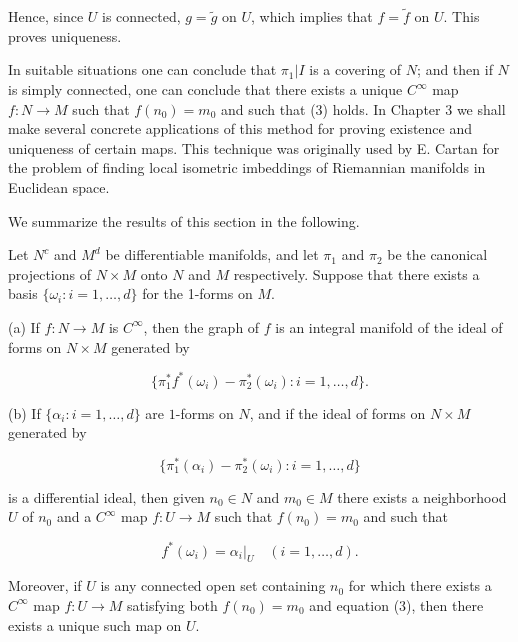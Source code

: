Hence, since $U$ is connected, $g = \tilde{g}$ on $U$, which implies that $f = \tilde{f}$ on $U$. This proves uniqueness.

In suitable situations one can conclude that  $ \pi_{1}|I $ is a covering of  $ N $; and then if  $ N $ is simply connected, one can conclude that there exists a unique  $ C^{\infty} $ map  $ f: N \to M $ such that  $ f(n_{0}) = m_{0} $ and such that (3) holds. In Chapter 3 we shall make several concrete applications of this method for proving existence and uniqueness of certain maps. This technique was originally used by E. Cartan for the problem of finding local isometric imbeddings of Riemannian manifolds in Euclidean space.

We summarize the results of this section in the following.


\begin{theorem}\label{thm:2.34}
Let $N^{c}$ and $M^{d}$ be differentiable manifolds, and let $\pi_{1}$ and $\pi_{2}$ be the canonical projections of $N\times M$ onto $N$ and $M$ respectively. Suppose that there exists a basis $\{\omega_{i}: i=1,\ldots,d\}$ for the 1-forms on $M$.

(a) If $f: N \to M$ is $C^{\infty}$, then the graph of $f$ is an integral manifold of the ideal of forms on $N \times M$ generated by

\begin{equation}
\tag{1}\label{eq:2.34:1}
\{\pi_{1}^{*}f^{*}(\omega_{i})-\pi_{2}^{*}(\omega_{i})\colon i=1,\ldots,d\}.
\end{equation}

(b) If $\{\alpha_{i}\colon i=1,\ldots,d\}$ are $1$-forms on $N$, and if the ideal of forms on  $ N \times M $ generated by

\begin{equation}
\tag{2}\label{eq:2.34:2}
\{\pi_{1}^{*}(\alpha_{i})-\pi_{2}^{*}(\omega_{i})\colon i=1,\ldots,d\}
\end{equation}

is a differential ideal, then given $n_{0}\in N$ and $m_{0}\in M$ there exists a neighborhood $U$ of $n_{0}$ and a $C^{\infty}$ map $f\colon U\to M$ such that $f(n_{0})=m_{0}$ and such that


\[
f^{*}(\omega_{i})=\alpha_{i}\big|_{U}\quad(i=1,\ldots,d).
\]

Moreover, if $U$ is any connected open set containing $n_{0}$ for which there exists a $C^{\infty}$ map $f: U \to M$ satisfying both $f(n_{0}) = m_{0}$ and equation (3), then there exists a unique such map on $U$.

\end{theorem}


